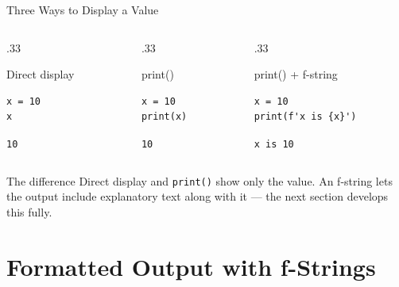 \documentclass[9pt,aspectratio=169,xcolor=table]{beamer}
\begin{document}
\begin{frame}[fragile]{Three Ways to Display a Value}
    \leavevmode
    \begin{columns}[t]
        \begin{column}{.33\textwidth}
            \begin{block}{Direct display}
                \scriptsize
\begin{lstlisting}
x = 10
x
\end{lstlisting}
                \tiny\texttt{10}
            \end{block}
        \end{column}
        \begin{column}{.33\textwidth}
            \begin{block}{print()}
                \scriptsize
\begin{lstlisting}
x = 10
print(x)
\end{lstlisting}
                \tiny\texttt{10}
            \end{block}
        \end{column}
        \begin{column}{.33\textwidth}
            \begin{block}{print() + f-string}
                \scriptsize
\begin{lstlisting}
x = 10
print(f'x is {x}')
\end{lstlisting}
                \tiny\texttt{x is 10}
            \end{block}
        \end{column}
    \end{columns}

    \vspace{4mm}
    \begin{alertblock}{The difference}
        Direct display and \texttt{print()} show only the value. An
        f-string lets the output include \alert{explanatory text}
        along with it --- the next section develops this fully.
    \end{alertblock}
\end{frame}

\section{Formatted Output with f-Strings}
\end{document}
